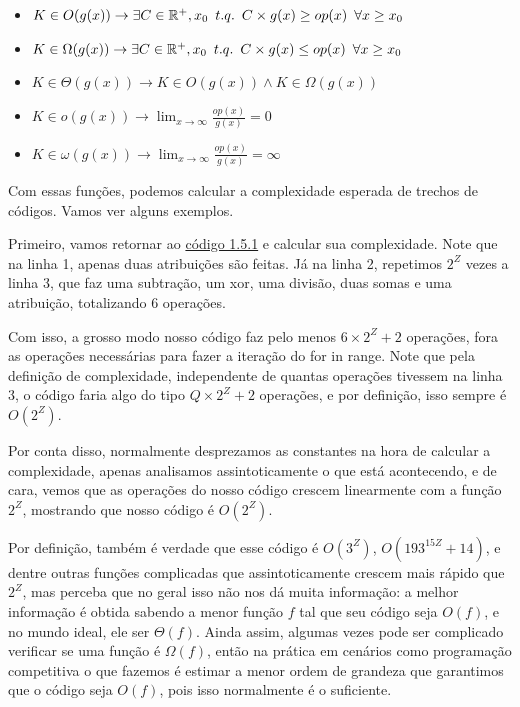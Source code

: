 \documentclass[11pt, a4paper]{article}
\begin{document}
\begin{itemize}
    \item \(K \in O(g(x)) \rightarrow \exists C \in \Real^{+}, x_0 \tb[0.5] t.q. \tb[0.5] C\times g(x) \geq op(x) \tb[0.5] \forall x \geq x_0\)
    \item \(K \in \Omega(g(x)) \rightarrow \exists C \in \Real^{+}, x_0 \tb[0.5] t.q. \tb[0.5] C\times g(x) \leq op(x) \tb[0.5] \forall x \geq x_0\)
    \item \(K \in \Theta(g(x)) \rightarrow K\in O(g(x)) \wedge K \in \Omega(g(x))\)
    \item \( \displaystyle K \in o(g(x)) \rightarrow \lim_{x \to \infty}\frac{op(x)}{g(x)}=0\)
    \item \( \displaystyle K \in \omega (g(x)) \rightarrow \lim_{x \to \infty}\frac{op(x)}{g(x)}=\infty\)
\end{itemize}

Com essas funções, podemos calcular a complexidade esperada de trechos de códigos. Vamos ver alguns exemplos.

Primeiro, vamos retornar ao \hyperref[c1.5.1]{código 1.5.1} e calcular sua complexidade. Note que na linha 1, apenas duas atribuições são feitas. Já na linha 2, repetimos \(2^Z\) vezes a linha 3, que faz uma subtração, um xor, uma divisão, duas somas e uma atribuição, totalizando 6 operações. 

Com isso, a grosso modo nosso código faz pelo menos \(6\times 2^Z+2\) operações, fora as operações necessárias para fazer a iteração do for in range. Note que pela definição de complexidade, independente de quantas operações tivessem na linha 3, o código faria algo do tipo \(Q\times 2^Z+2\) operações, e por definição, isso sempre é \(O(2^Z)\). 

Por conta disso, normalmente desprezamos as constantes na hora de calcular a complexidade, apenas analisamos assintoticamente o que está acontecendo, e de cara, vemos que as operações do nosso código crescem linearmente com a função \(2^Z\), mostrando que nosso código é \(O(2^Z)\). 

Por definição, também é verdade que esse código é \(O(3^Z)\), \(O(193^{15Z}+14)\), e dentre outras funções complicadas que assintoticamente crescem mais rápido que \(2^Z\), mas perceba que no geral isso não nos dá muita informação: a melhor informação é obtida sabendo a menor função \(f\) tal que seu código seja \(O(f)\), e no mundo ideal, ele ser \(\Theta(f)\). Ainda assim, algumas vezes pode ser complicado verificar se uma função é \(\Omega(f)\), então na prática em cenários como programação competitiva o que fazemos é estimar a menor ordem de grandeza que garantimos que o código seja \(O(f)\), pois isso normalmente é o suficiente.
\end{document}
